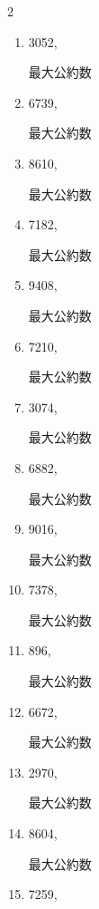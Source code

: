 \begin{multicols}{2}
\begin{enumerate}
  \item 3052,

        最大公約数

  \item 6739,

        最大公約数

  \item 8610,

        最大公約数

  \item 7182,

        最大公約数

\columnbreak %

  \item 9408,

        最大公約数

  \item 7210,

        最大公約数

  \item 3074,

        最大公約数

  \item 6882,

        最大公約数

  \item 9016,

        最大公約数

\columnbreak %

\resetques

  \item 7378,

        最大公約数

  \item 896,

        最大公約数

  \item 6672,

        最大公約数

  \item 2970,

        最大公約数

  \item 8604,

        最大公約数

\columnbreak %

  \item 7259,


\end{enumerate}
\end{multicols}
